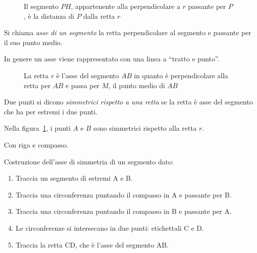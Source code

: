 \begin{inaccessibleblock}
 \begin{figure}[htb]
\centering
\caption{Il segmento $PH$, appartenente alla perpendicolare a $r$ 
passante per $P$, è la distanza di $P$ dalla retta $r$}
\end{figure}
\end{inaccessibleblock}

\begin{definizione}\label{def:asse_segmento}
Si chiama \emph{asse di un segmento} la retta perpendicolare al 
segmento e passante per il suo punto medio.
\end{definizione}

In genere un asse viene rappresentato con una linea a ``tratto e 
punto''.

\begin{inaccessibleblock}
 \begin{figure}[htb]
\centering
\caption{La retta $r$ è l'asse del segmento $AB$ in quanto è 
perpendicolare alla retta per $AB$ e passa per $M$, il punto medio di 
$AB$}\label{fig:1.38}
\end{figure}
\end{inaccessibleblock}

\begin{definizione}
Due punti si dicono \emph{simmetrici rispetto a una retta} se la 
retta è asse del segmento che ha per estremi i due punti.
\end{definizione}

Nella figura~\ref{fig:1.38}, i punti $A$ e $B$ sono simmetrici 
rispetto alla retta $r$.

Con riga e compasso.

\begin{procedura}\label{proc:fonda_asse}
  Costruzione dell'asse di simmetria di un segmento dato:
  \begin{enumerate} [nosep]
    \item 
    Traccia un segmento di estremi A e B.
    \item 
    Traccia una circonferenza puntando il compasso in A e passante per B.
    \item 
    Traccia una circonferenza puntando il compasso in B e passante per A.  
    \item 
    Le circonferenze si intersecano in due punti: etichettali C e D.
    \item 
    Traccia la retta CD, che è l'asse del segmento AB.
  \end{enumerate}
\end{procedura}

